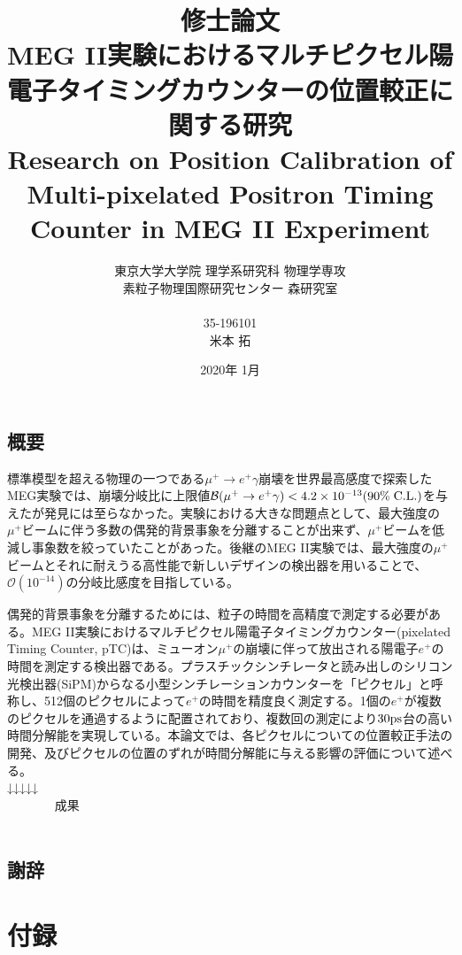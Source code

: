 \documentclass[report]{jsbook}
\title{
修士論文\\[1.8cm]
{\bf MEG II実験におけるマルチピクセル陽電子タイミングカウンターの位置較正に関する研究} \\
{\LARGE Research on Position Calibration of Multi-pixelated Positron Timing Counter in MEG II Experiment}
\\[0.8cm]}
\author{東京大学大学院 理学系研究科 物理学専攻\\
素粒子物理国際研究センター 森研究室\\ \\
35-196101\\[2.5mm]
\LARGE 米本 拓}
\date{2020年 1月}
\begin{document}

\maketitle
\chapter*{概要}

標準模型を超える物理の一つである$\mu^+ \to e^+\gamma$崩壊を世界最高感度で探索したMEG実験では、崩壊分岐比に上限値$\mathcal{B} (\mu^+ \to e^+\gamma) < 4.2 \times 10^{-13} (90\% \; {\rm C.L.})$を与えたが発見には至らなかった。実験における大きな問題点として、最大強度の$\mu^+$ビームに伴う多数の偶発的背景事象を分離することが出来ず、$\mu^+$ビームを低減し事象数を絞っていたことがあった。後継のMEG II実験では、最大強度の$\mu^+$ビームとそれに耐えうる高性能で新しいデザインの検出器を用いることで、$\mathcal{O}(10^{-14})$の分岐比感度を目指している。 

偶発的背景事象を分離するためには、粒子の時間を高精度で測定する必要がある。MEG II実験におけるマルチピクセル陽電子タイミングカウンター(pixelated Timing Counter, pTC)は、ミューオン$\mu^+$の崩壊に伴って放出される陽電子$e^+$の時間を測定する検出器である。プラスチックシンチレータと読み出しのシリコン光検出器(SiPM)からなる小型シンチレーションカウンターを「ピクセル」と呼称し、512個のピクセルによって$e^+$の時間を精度良く測定する。1個の$e^+$が複数のピクセルを通過するように配置されており、複数回の測定により$ 30 \rm ps$台の高い時間分解能を実現している。本論文では、各ピクセルについての位置較正手法の開発、及びピクセルの位置のずれが時間分解能に与える影響の評価について述べる。 \\

↓↓↓↓↓ \\
~~~~~~~   成果  ~~~~~~~~~\\ \\

\setcounter{tocdepth}{2}
\tableofcontents








\chapter*{謝辞}

\part{付録}
\appendix
\end{document}
